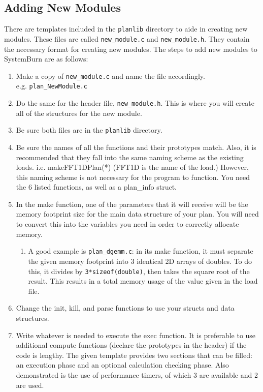 \subsection{Adding New Modules}

There are templates included in the \verb!planlib! directory to aide
in creating new modules. These files are called \verb!new_module.c! and
\verb!new_module.h!. They contain the necessary format for creating new
modules. The steps to add new modules to SystemBurn are as follows:

\begin{enumerate}
        \item Make a copy of \verb!new_module.c! and name the file accordingly.\\ e.g. \verb!plan_NewModule.c!
	\item Do the same for the header file, \verb!new_module.h!. This is where you will create all of the structures for the new module.
	\item Be sure both files are in the \verb!planlib! directory.
        \item Be sure the names of all the functions and their prototypes match. Also, it is recommended that they fall into the same naming scheme as the existing loads. i.e. makeFFT1DPlan(*) (FFT1D is the name of the load.) However, this naming scheme is not necessary for the program to function. You need the 6 listed functions, as well as a plan\_info struct.
	\item In the make function, one of the parameters that it will receive will be the memory footprint size for the main data structure of your plan. You will need to convert this into the variables you need in order to correctly allocate memory.
		\begin{enumerate}
			\item A good example is \verb!plan_dgemm.c!: in its make function, it must separate the given memory footprint into 3 identical 2D arrays of doubles. To do this, it divides by \verb!3*sizeof(double)!, then takes the square root of the result. This results in a total memory usage of the value given in the load file.
		\end{enumerate}
        \item Change the init, kill, and parse functions to use your structs and data structures.
        \item Write whatever is needed to execute the exec function. It is preferable to use additional compute functions (declare the prototypes in the header) if the code is lengthy. The given template provides two sections that can be filled: an execution phase and an optional calculation checking phase. Also demonstrated is the use of performance timers, of which 3 are available and 2 are used.

\end{enumerate}
